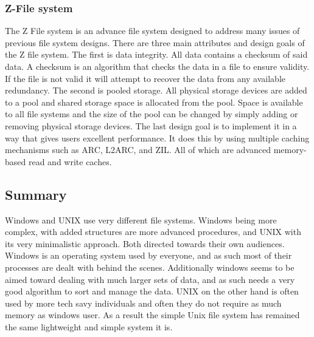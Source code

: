 \documentclass[a4paper,10pt,onecolumn]{article}
\begin{document}
\subsubsection{Z-File system}
The Z File system is an advance file system designed to address many issues of previous file system designs. There are three main attributes and design goals of the Z file system. 
\newline 
\newline
The first is data integrity. All data contains a checksum of said data. A checksum is an algorithm that checks the data in a file to ensure validity. If the file is not valid it will attempt to recover the data from any available redundancy.
\newline
\newline
The second is pooled storage. All physical storage devices are added to a pool and shared storage space is allocated from the pool. Space is available to all file systems and the size of the pool can be changed by simply adding or removing physical storage devices.
\newline
\newline
The last design goal is to implement it in a way that gives users excellent performance. It does this by using multiple caching mechanisms such as ARC, L2ARC, and ZIL. All of which are advanced memory-based read and write caches.
\subsection{Summary}
Windows and UNIX use very different file systems. Windows being more complex, with added structures are more advanced procedures, and UNIX with its very minimalistic approach. Both directed towards their own audiences. Windows is an operating system used by everyone, and as such most of their processes are dealt with behind the scenes. Additionally windows seems to be aimed toward dealing with much larger sets of data, and as such needs a very good algorithm to sort and manage the data. 
\newline
UNIX on the other hand is often used by more tech savy individuals and often they do not require as much memory as windows user. As a result the simple Unix file system has remained the same lightweight and simple system it is. 
 
\end{document}
